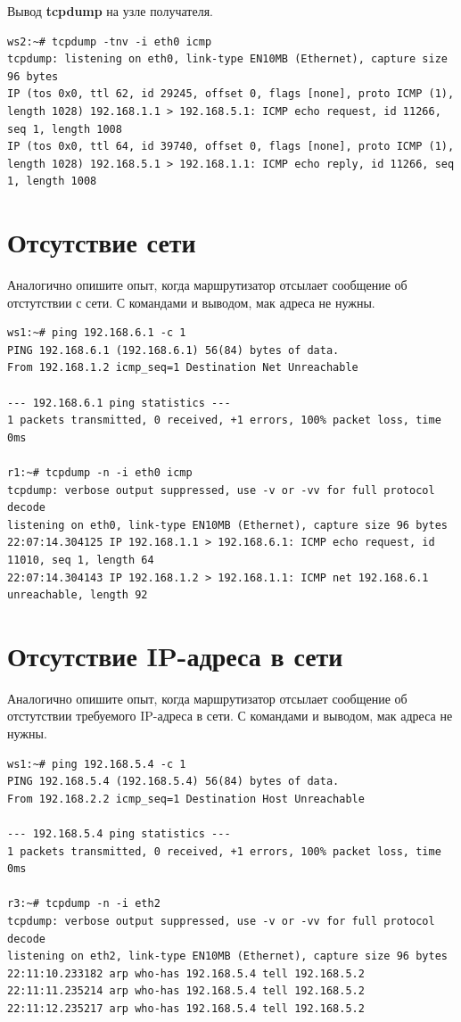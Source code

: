 \documentclass[a4paper,12pt]{article}
\begin{document}
Вывод \textbf{tcpdump} на узле получателя.

\begin{Verbatim}
ws2:~# tcpdump -tnv -i eth0 icmp
tcpdump: listening on eth0, link-type EN10MB (Ethernet), capture size 96 bytes
IP (tos 0x0, ttl 62, id 29245, offset 0, flags [none], proto ICMP (1), length 1028) 192.168.1.1 > 192.168.5.1: ICMP echo request, id 11266, seq 1, length 1008
IP (tos 0x0, ttl 64, id 39740, offset 0, flags [none], proto ICMP (1), length 1028) 192.168.5.1 > 192.168.1.1: ICMP echo reply, id 11266, seq 1, length 1008
\end{Verbatim}


\section{Отсутствие сети}

Аналогично опишите опыт, когда маршрутизатор отсылает сообщение об отстутствии с сети.
С командами и выводом, мак адреса не нужны.

\begin{Verbatim}
ws1:~# ping 192.168.6.1 -c 1
PING 192.168.6.1 (192.168.6.1) 56(84) bytes of data.
From 192.168.1.2 icmp_seq=1 Destination Net Unreachable

--- 192.168.6.1 ping statistics ---
1 packets transmitted, 0 received, +1 errors, 100% packet loss, time 0ms

r1:~# tcpdump -n -i eth0 icmp
tcpdump: verbose output suppressed, use -v or -vv for full protocol decode
listening on eth0, link-type EN10MB (Ethernet), capture size 96 bytes
22:07:14.304125 IP 192.168.1.1 > 192.168.6.1: ICMP echo request, id 11010, seq 1, length 64
22:07:14.304143 IP 192.168.1.2 > 192.168.1.1: ICMP net 192.168.6.1 unreachable, length 92
\end{Verbatim}


\section{Отсутствие IP-адреса в сети}

Аналогично опишите опыт, когда маршрутизатор отсылает сообщение об отстутствии требуемого IP-адреса в сети.
С командами и выводом, мак адреса не нужны.

\begin{Verbatim}
ws1:~# ping 192.168.5.4 -c 1
PING 192.168.5.4 (192.168.5.4) 56(84) bytes of data.
From 192.168.2.2 icmp_seq=1 Destination Host Unreachable

--- 192.168.5.4 ping statistics ---
1 packets transmitted, 0 received, +1 errors, 100% packet loss, time 0ms

r3:~# tcpdump -n -i eth2
tcpdump: verbose output suppressed, use -v or -vv for full protocol decode
listening on eth2, link-type EN10MB (Ethernet), capture size 96 bytes
22:11:10.233182 arp who-has 192.168.5.4 tell 192.168.5.2
22:11:11.235214 arp who-has 192.168.5.4 tell 192.168.5.2
22:11:12.235217 arp who-has 192.168.5.4 tell 192.168.5.2
\end{Verbatim}
\end{document}
